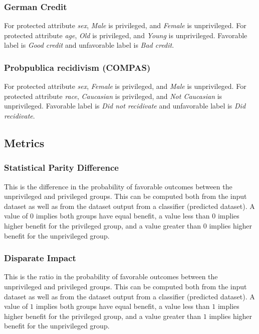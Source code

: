 \documentclass{article}
\begin{document}
\subsubsection{German Credit}
For protected attribute \textit{sex}, \textit{Male} is privileged, and \textit{Female} is unprivileged. For protected attribute \textit{age}, \textit{Old} is privileged, and \textit{Young} is unprivileged. Favorable label is \textit{Good credit} and unfavorable label is \textit{Bad credit}.
 
\subsubsection{Probpublica recidivism (COMPAS)}
For protected attribute \textit{sex}, \textit{Female} is privileged, and \textit{Male} is unprivileged. For protected attribute \textit{race}, \textit{Caucasian} is privileged, and \textit{Not Caucasian} is unprivileged. Favorable label is \textit{Did not recidivate} and unfavorable label is \textit{Did recidivate}.
 

\subsection{Metrics}
\subsubsection{Statistical Parity Difference}
This is the difference in the probability of favorable outcomes between the unprivileged and privileged groups. This can be computed both from the input dataset as well as from the dataset output from a classifier (predicted dataset). A value of $0$ implies both groups have equal benefit, a value less than $0$ implies higher benefit for the privileged group, and a value greater than $0$ implies higher benefit for the unprivileged group.

\subsubsection{Disparate Impact}
This is the ratio in the probability of favorable outcomes between the unprivileged and privileged groups. This can be computed both from the input dataset as well as from the dataset output from a classifier (predicted dataset). A value of $1$ implies both groups have equal benefit, a value less than $1$ implies higher benefit for the privileged group, and a value greater than $1$ implies higher benefit for the unprivileged group.
\end{document}
